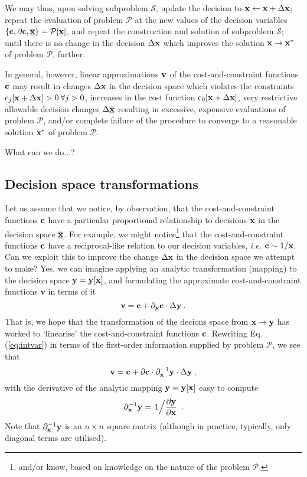 \documentclass[11pt]{article}
\begin{document}
We may thus, upon solving subproblem $\mathcal{S}$, update the decision to $\mathbf{x} \gets \mathbf{x} + \Delta \mathbf{x}$; repeat the evaluation of problem $\mathcal{P}$ at the new values of the decision variables $\left\{\mathbf{c}, \partial \mathbf{c}, \underline{\overline{\mathbf{x}}}\right\}=\mathcal{P}[\mathbf{x}]$, and repeat the construction and solution of subproblem $\mathcal{S}$; until there is no change in the decision $\Delta \mathbf{x}$ which improves the solution $\mathbf{x} \to \mathbf{x}^\ast$ of problem $\mathcal{P}$, further. 

In general, however, linear approximations $\mathbf{v}$ of the cost-and-constraint functions $\mathbf{c}$ may result in changes $\Delta \mathbf{x}$ in the decision space which violates the constraints $\textrm{c}_j[\mathbf{x} + \Delta \mathbf{x}] > 0 \: \forall j > 0$, increases in the cost function $\textrm{c}_0[\mathbf{x} + \Delta \mathbf{x}]$, very restrictive allowable decision changes $\Delta \underline{\overline{\mathbf{x}}}$ resulting in excessive, expensive evaluations of problem $\mathcal{P}$, and/or complete failure of the procedure to converge to a reasonable solution $\mathbf{x}^\ast$ of problem $\mathcal{P}$.

What can we do...?

\subsection{Decision space transformations}

Let us assume that we notice, by observation, that the cost-and-constraint functions $\mathbf{c}$ have a particular proportional relationship to decisions $\mathbf{x}$ in the decision space $\underline{\overline{\mathbf{x}}}$. For example, we might notice\footnote{and/or know, based on knowledge on the nature of the problem $\mathcal{P}$.} that the cost-and-constraint functions $\mathbf{c}$ have a reciprocal-like relation to our decision variables, \emph{i.e.} $\mathbf{c} \sim 1/\mathbf{x}$. Can we exploit this to improve the change $\Delta \mathbf{x}$ in the decision space we attempt to make? Yes, we can imagine applying an analytic transformation (mapping) to the decision space $\mathbf{y} = \mathbf{y}[\mathbf{x}]$, and formulating the approximate cost-and-constraint functions $\textbf{v}$ in terms of it
\begin{equation}
\label{eq:intvar}
    \textbf{v} = \mathbf{c} +   \partial_{\mathbf{y}} \mathbf{c} \cdot \Delta \mathbf{y} \:.
\end{equation}
That is, we hope that the transformation of the decions space from $\mathbf{x} \to \mathbf{y}$ has worked to `linearise' the cost-and-constraint functions $\mathbf{c}$. Rewriting Eq. (\ref{eq:intvar}) in terms of the first-order information supplied by problem $\mathcal{P}$, we see that
\begin{equation}
    \textbf{v} = \mathbf{c} + \partial \mathbf{c} \cdot \partial_{\mathbf{x}}^{-1} \mathbf{y} \cdot  \Delta \mathbf{y}    \:,
\end{equation}
with the derivative of the analytic mapping $\mathbf{y} = \mathbf{y}[\mathbf{x}]$ easy to compute
\begin{equation}
    \partial_{\mathbf{x}}^{-1} \mathbf{y} = \left. 1 \Big/ \frac{\partial \mathbf{y}}{\partial \mathbf{x}}\right. \: .
\end{equation}
Note that  $\partial_{\mathbf{x}}^{-1}\mathbf{y}$ is an $n \times n$ square matrix (although in practice, typically, only diagonal terms are utilised).
\end{document}
